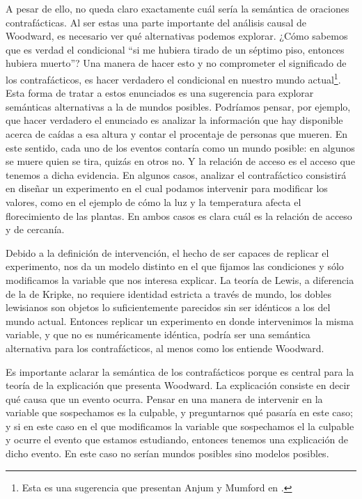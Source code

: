A pesar de ello, no queda claro exactamente cuál sería la semántica de oraciones contrafácticas. Al ser estas una parte importante del análisis causal de Woodward, es necesario ver qué alternativas podemos explorar. ¿Cómo sabemos que es verdad el condicional ``si me hubiera tirado de un séptimo piso, entonces hubiera muerto''? Una manera de hacer esto y no comprometer el significado de los contrafácticos, es hacer verdadero el condicional en nuestro mundo actual\footnote{Esta es una sugerencia que presentan Anjum y Mumford en \cite{Mumford2013}.}. Esta forma de tratar a estos enunciados es una sugerencia para explorar semánticas alternativas a la de mundos posibles. Podríamos pensar, por ejemplo, que hacer verdadero el enunciado es analizar la información que hay disponible acerca de caídas a esa altura y contar el procentaje de personas que mueren. En este sentido, cada uno de los eventos contaría como un mundo posible: en algunos se muere quien se tira, quizás en otros no. Y la relación de acceso es el acceso que tenemos a dicha evidencia. En algunos casos, analizar el contrafáctico consistirá en diseñar un experimento en el cual podamos intervenir para modificar los valores, como en el ejemplo de cómo la luz y la temperatura afecta el florecimiento de las plantas. En ambos casos es clara cuál es la relación de acceso y de cercanía.

Debido a la definición de intervención, el hecho de ser capaces de replicar el experimento, nos da un modelo distinto en el que fijamos las condiciones y sólo modificamos la variable que nos interesa explicar. La teoría de Lewis, a diferencia de la de Kripke, no requiere identidad estricta a través de mundo, los dobles lewisianos son objetos lo suficientemente parecidos sin ser idénticos a los del mundo actual. Entonces replicar un experimento en donde intervenimos la misma variable, y que no es numéricamente idéntica, podría ser una semántica alternativa para los contrafácticos, al menos como los entiende Woodward.

Es importante aclarar la semántica de los contrafácticos porque es central para la teoría de la explicación que presenta Woodward. La explicación consiste en decir qué causa que un evento ocurra. Pensar en una manera de intervenir en la variable que sospechamos es la culpable, y preguntarnos qué pasaría en este caso; y si en este caso en el que modificamos la variable que sospechamos el la culpable y ocurre el evento que estamos estudiando, entonces tenemos una explicación de dicho evento. En este caso no serían mundos posibles sino modelos posibles.

